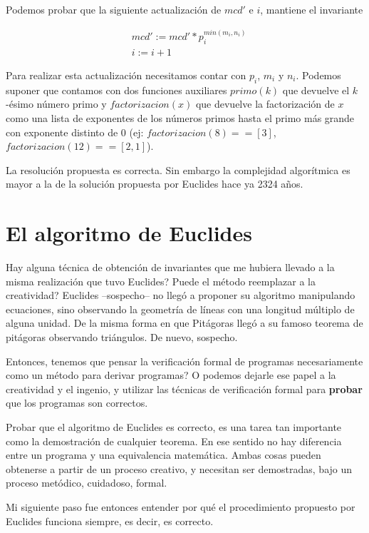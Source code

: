 \documentclass[12pt, a4paper, openany, fleqn]{book}
\begin{document}
    Podemos probar que la siguiente actualización de $mcd'$ e $i$, mantiene el invariante

    \begin{align*}
        & mcd' := mcd' * p_{i}^{min(m_{i}, n_{i})} \\
        & i := i + 1
    \end{align*}

    Para realizar esta actualización necesitamos contar con $p_{i}$, $m_{i}$ y $n_{i}$.
    Podemos suponer que contamos con dos funciones auxiliares $primo(k)$ que devuelve el $k$-ésimo número primo y $factorizacion(x)$ que devuelve la factorización de $x$ como una lista de exponentes de los números primos hasta el primo más grande con exponente distinto de 0 (ej: $factorizacion(8) == [3]$, $factorizacion(12) == [2,1]$).

    La resolución propuesta es correcta. Sin embargo la complejidad algorítmica es mayor a la de la solución propuesta por Euclides hace ya 2324 años.

    \section{El algoritmo de Euclides}
    Hay alguna técnica de obtención de invariantes que me hubiera llevado a la misma realización que tuvo Euclides? Puede el método reemplazar a la creatividad?
    Euclides --sospecho-- no llegó a proponer su algoritmo manipulando ecuaciones, sino observando la geometría de líneas con una longitud múltiplo de alguna unidad. De la misma forma en que Pitágoras llegó a su famoso teorema de pitágoras observando triángulos. De nuevo, sospecho.

    Entonces, tenemos que pensar la verificación formal de programas necesariamente como un método para derivar programas? O podemos dejarle ese papel a la creatividad y el ingenio, y utilizar las técnicas de verificación formal para \textbf{probar} que los programas son correctos.

    Probar que el algoritmo de Euclides es correcto, es una tarea tan importante como la demostración de cualquier teorema. En ese sentido no hay diferencia entre un programa y una equivalencia matemática. Ambas cosas pueden obtenerse a partir de un proceso creativo, y necesitan ser demostradas, bajo un proceso metódico, cuidadoso, formal.

    Mi siguiente paso fue entonces entender por qué el procedimiento propuesto por Euclides funciona siempre, es decir, es correcto.
\end{document}

